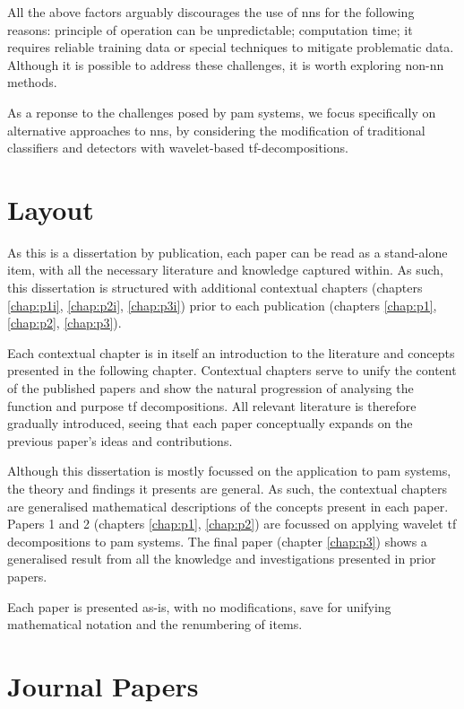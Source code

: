 All the above factors arguably discourages the use of \acp{nn} for the following reasons: principle of operation can be unpredictable; computation time; it requires reliable training data or special techniques to mitigate problematic data. Although it is possible to address these challenges, it is worth exploring non-\ac{nn} methods. 

As a reponse to the challenges posed by \ac{pam} systems, we focus specifically on alternative approaches to \acp{nn}, by considering the modification of traditional classifiers and detectors with wavelet-based \ac{tf}-decompositions.

\section{Layout}

As this is a dissertation by publication, each paper can be read as a stand-alone item, with all the necessary literature and knowledge captured within. As such, this dissertation is structured with additional contextual chapters (chapters \ref*{chap:p1i}, \ref*{chap:p2i}, \ref*{chap:p3i}) prior to each publication (chapters \ref*{chap:p1}, \ref*{chap:p2}, \ref*{chap:p3}).

Each contextual chapter is in itself an introduction to the literature and concepts presented in the following chapter. Contextual chapters serve to unify the content of the published papers and show the natural progression of analysing the function and purpose \ac{tf} decompositions. All relevant literature is therefore gradually introduced, seeing that each paper conceptually expands on the previous paper's ideas and contributions.

Although this dissertation is mostly focussed on the application to \ac{pam} systems, the theory and findings it presents are general. As such, the contextual chapters are generalised mathematical descriptions of the concepts present in each paper. Papers 1 and 2 (chapters \ref*{chap:p1}, \ref*{chap:p2}) are focussed on applying wavelet \ac{tf} decompositions to \ac{pam} systems. The final paper (chapter \ref*{chap:p3}) shows a generalised result from all the knowledge and investigations presented in prior papers.

Each paper is presented as-is, with no modifications, save for unifying mathematical notation and the renumbering of items.


\section{Journal Papers}

